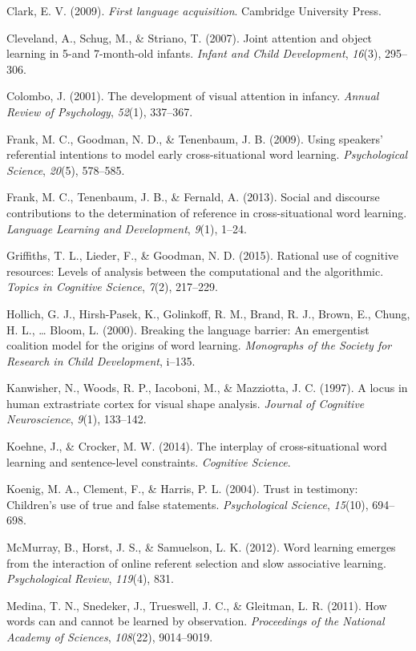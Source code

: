 \documentclass[authoryear, review]{elsarticle}
\begin{document}
Clark, E. V. (2009). \emph{First language acquisition}. Cambridge
University Press.

Cleveland, A., Schug, M., \& Striano, T. (2007). Joint attention and
object learning in 5-and 7-month-old infants. \emph{Infant and Child
Development}, \emph{16}(3), 295--306.

Colombo, J. (2001). The development of visual attention in infancy.
\emph{Annual Review of Psychology}, \emph{52}(1), 337--367.

Frank, M. C., Goodman, N. D., \& Tenenbaum, J. B. (2009). Using
speakers' referential intentions to model early cross-situational word
learning. \emph{Psychological Science}, \emph{20}(5), 578--585.

Frank, M. C., Tenenbaum, J. B., \& Fernald, A. (2013). Social and
discourse contributions to the determination of reference in
cross-situational word learning. \emph{Language Learning and
Development}, \emph{9}(1), 1--24.

Griffiths, T. L., Lieder, F., \& Goodman, N. D. (2015). Rational use of
cognitive resources: Levels of analysis between the computational and
the algorithmic. \emph{Topics in Cognitive Science}, \emph{7}(2),
217--229.

Hollich, G. J., Hirsh-Pasek, K., Golinkoff, R. M., Brand, R. J., Brown,
E., Chung, H. L., \ldots{} Bloom, L. (2000). Breaking the language
barrier: An emergentist coalition model for the origins of word
learning. \emph{Monographs of the Society for Research in Child
Development}, i--135.

Kanwisher, N., Woods, R. P., Iacoboni, M., \& Mazziotta, J. C. (1997). A
locus in human extrastriate cortex for visual shape analysis.
\emph{Journal of Cognitive Neuroscience}, \emph{9}(1), 133--142.

Koehne, J., \& Crocker, M. W. (2014). The interplay of cross-situational
word learning and sentence-level constraints. \emph{Cognitive Science}.

Koenig, M. A., Clement, F., \& Harris, P. L. (2004). Trust in testimony:
Children's use of true and false statements. \emph{Psychological
Science}, \emph{15}(10), 694--698.

McMurray, B., Horst, J. S., \& Samuelson, L. K. (2012). Word learning
emerges from the interaction of online referent selection and slow
associative learning. \emph{Psychological Review}, \emph{119}(4), 831.

Medina, T. N., Snedeker, J., Trueswell, J. C., \& Gleitman, L. R.
(2011). How words can and cannot be learned by observation.
\emph{Proceedings of the National Academy of Sciences}, \emph{108}(22),
9014--9019.
\end{document}
